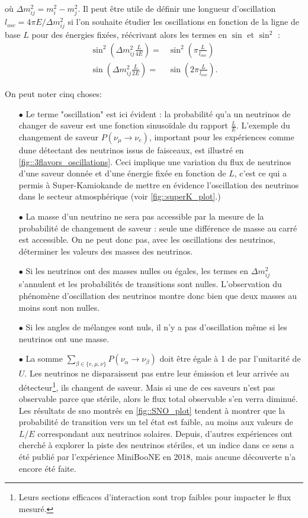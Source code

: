         où $\Delta m_{ij}^2 = m_i^2-m_j^2$. Il peut être utile de définir une longueur d'oscillation $l_{osc} = 4\pi E/\Delta m_{ij}^2$ si l'on souhaite étudier les oscillations en fonction de la ligne de base $L$ pour des énergies fixées, réécrivant alors les termes en $\sin$ et $\sin^2$ :
        \begin{eqnarray}
          \sin^2\left(\Delta m_{ij}^2\frac{L}{4E}\right) = &  \sin^2\left(\pi\frac{L}{l_{osc}}\right) \\
          \sin\left(\Delta m_{ij}^2\frac{L}{2E}\right) = & \sin\left(2\pi\frac{L}{l_{osc}}\right).
        \end{eqnarray}
        
        On peut noter cinq choses:
        \begin{itemize}
          \item[$\bullet$] Le terme "oscillation" est ici évident : la probabilité qu'a un neutrinos de changer de saveur est une fonction sinusoïdale du rapport $\frac{L}{E}$. L'exemple du changement de saveur $P(\nu_{\mu}\to\nu_e)$, important pour les expériences comme \gls{dune} détectant des neutrinos issus de faisceaux, est illustré en \autoref{fig::3flavors_oscillations}. Ceci implique une variation du flux de neutrinos d'une saveur donnée et d'une énergie fixée en fonction de $L$, c'est ce qui a permis à Super-Kamiokande de mettre en évidence l'oscillation des neutrinos dans le secteur atmosphérique (voir \autoref{fig::superK_plot}.)
          \item[$\bullet$] La masse d'un neutrino ne sera pas accessible par la mesure de la probabilité de changement de saveur : seule une différence de masse au carré est accessible. On ne peut donc pas, avec les oscillations des neutrinos, déterminer les valeurs des masses des neutrinos.
          \item[$\bullet$] Si les neutrinos ont des masses nulles ou égales, les termes en $\Delta m_{ij}^2$ s'annulent et les probabilités de transitions sont nulles. L'observation du phénomène d'oscillation des neutrinos montre donc bien que deux masses au moins sont non nulles.
          \item[$\bullet$] Si les angles de mélanges sont nuls, il n'y a pas d'oscillation même si les neutrinos ont une masse.
          \item[$\bullet$] La somme $\sum_{\beta\in\{e,\mu,\nu\}}P(\nu_{\alpha}\to\nu_{\beta})$ doit être égale à 1 de par l'unitarité de $U$. Les neutrinos ne disparaissent pas entre leur émission et leur arrivée au détecteur\footnote{Leurs sections efficaces d'interaction sont trop faibles pour impacter le flux mesuré.}, ils changent de saveur. Mais si une de ces saveurs n'est pas observable parce que stérile, alors le flux total observable s'en verra diminué. Les résultats de \gls{sno} montrés en \autoref{fig::SNO_plot} tendent à montrer que la probabilité de transition vers un tel état est faible, au moins aux valeurs de $L/E$ correspondant aux neutrinos solaires. Depuis, d'autres expériences ont cherché à explorer la piste des neutrinos stériles, et un indice dans ce sens a été publié par l'expérience MiniBooNE\cite{Arevalo2018} en 2018, mais aucune découverte n'a encore été faite.
        \end{itemize}
